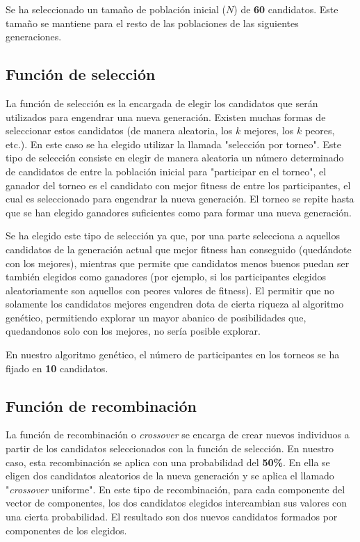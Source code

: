 Se ha seleccionado un tamaño de población inicial ($N$) de \textbf{60} candidatos. Este tamaño se mantiene para el resto de las poblaciones de las siguientes generaciones.

\subsection{Función de selección}
La función de selección es la encargada de elegir los candidatos que serán utilizados para engendrar una nueva generación. Existen muchas formas de seleccionar estos candidatos (de manera aleatoria, los $k$ mejores, los $k$ peores, etc.). En este caso
se ha elegido utilizar la llamada "selección por torneo". Este tipo de selección consiste en elegir de manera aleatoria un número determinado de candidatos de entre la población inicial para "participar en el torneo", el ganador del torneo es el candidato
con mejor fitness de entre los participantes, el cual es seleccionado para engendrar la nueva generación. El torneo se repite hasta que se han elegido ganadores suficientes como para formar una nueva generación.

Se ha elegido este tipo de selección ya que, por una parte selecciona a aquellos candidatos de la generación actual que mejor fitness han conseguido (quedándote con los mejores), mientras que permite que candidatos menos buenos puedan ser también elegidos como ganadores
(por ejemplo, si los participantes elegidos aleatoriamente son aquellos con peores valores de fitness). El permitir que no solamente los candidatos mejores engendren dota de cierta riqueza al algoritmo genético, permitiendo explorar un mayor abanico de posibilidades
que, quedandonos solo con los mejores, no sería posible explorar.

En nuestro algoritmo genético, el número de participantes en los torneos se ha fijado en \textbf{10} candidatos.

\subsection{Función de recombinación}
La función de recombinación o \textit{crossover} se encarga de crear nuevos individuos a partir de los candidatos seleccionados con la función de selección. En nuestro caso, esta recombinación se aplica con una probabilidad del \textbf{50\%}. En ella se eligen dos candidatos aleatorios de la nueva
generación y se aplica el llamado "\textit{crossover} uniforme". En este tipo de recombinación, para cada componente del vector de componentes, los dos candidatos elegidos intercambian sus valores con una cierta probabilidad. El resultado son dos nuevos candidatos formados por componentes de los
elegidos.

